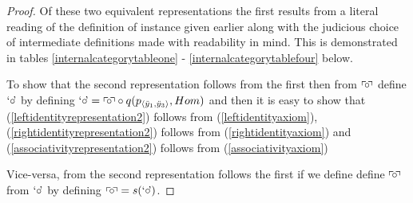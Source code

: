 \begin{proof}
Of these two equivalent representations the first results from a literal reading of the definition of instance given earlier
along with the judicious choice of intermediate definitions made with readability in mind.
This is demonstrated in tables \ref{internalcategorytableone}  - \ref{internalcategorytablefour} below. 

To show that the second representation follows from the first then from $\left\ulcorner\kern-2pt\circ \kern-2pt\right\urcorner$ define $\text{`$\circ$\kern-2pt'}$ by defining $\text{`$\circ$\kern-2pt'}=\left\ulcorner\kern-2pt\circ \kern-2pt\right\urcorner \circ q(p_{\langle\ddot y_1,\ddot y_3\rangle},Hom)$ and then it is easy to show that 
(\ref{leftidentityrepresentation2}) follows from (\ref{leftidentityaxiom}), 
(\ref{rightidentityrepresentation2}) follows from (\ref{rightidentityaxiom}) and
(\ref{associativityrepresentation2}) follows from (\ref{associativityaxiom})

Vice-versa, from the second representation follows the first if we define define $\left\ulcorner\kern-2pt\circ \kern-2pt\right\urcorner$ from  $\text{`$\circ$\kern-2pt'}$ by defining $\left\ulcorner\kern-2pt\circ \kern-2pt\right\urcorner=s(\text{`$\circ$\kern-2pt'})$.


\end{proof}
